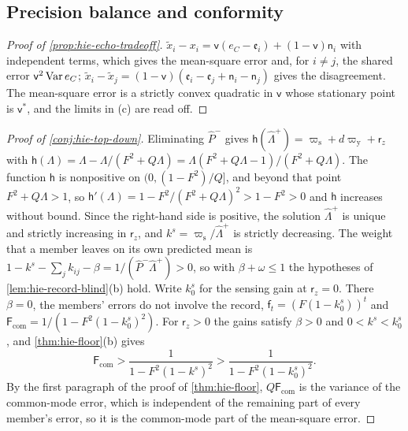 \subsection*{Precision balance and conformity}

\begin{proof}[Proof of \cref{prop:hie-echo-tradeoff}]
$\tilde x_i-x_i=\mathsf v(e_C-\mathfrak e_i)+(1-\mathsf v)\mathsf n_i$ with independent terms, which gives the mean-square error and, for $i\neq j$, the shared error $\mathsf v^2\operatorname{Var} e_C$; $\tilde x_i-\tilde x_j=(1-\mathsf v)(\mathfrak e_i-\mathfrak e_j+\mathsf n_i-\mathsf n_j)$ gives the disagreement. The mean-square error is a strictly convex quadratic in $\mathsf v$ whose stationary point is $\mathsf v^\ast$, and the limits in (c) are read off.
\end{proof}

\begin{proof}[Proof of \cref{conj:hie-top-down}]
Eliminating $\hat P^-$ gives $\mathsf h(\hat\Lambda^+)=\varpi_{\mathrm s}+d\varpi_{\mathrm y}+\mathsf r_z$ with $\mathsf h(\Lambda)=\Lambda-\Lambda/(F^2+Q\Lambda)=\Lambda(F^2+Q\Lambda-1)/(F^2+Q\Lambda)$. The function $\mathsf h$ is nonpositive on $(0,(1-F^2)/Q]$, and beyond that point $F^2+Q\Lambda>1$, so $\mathsf h'(\Lambda)=1-F^2/(F^2+Q\Lambda)^2>1-F^2>0$ and $\mathsf h$ increases without bound. Since the right-hand side is positive, the solution $\hat\Lambda^+$ is unique and strictly increasing in $\mathsf r_z$, and $k^s=\varpi_{\mathrm s}/\hat\Lambda^+$ is strictly decreasing. The weight that a member leaves on its own predicted mean is $1-k^s-\sum_jk_{ij}-\beta=1/(\hat P^-\hat\Lambda^+)>0$, so with $\beta+\omega\le1$ the hypotheses of \cref{lem:hie-record-blind}(b) hold. Write $k^s_0$ for the sensing gain at $\mathsf r_z=0$. There $\beta=0$, the members' errors do not involve the record, $\mathsf f_t=(F(1-k^s_0))^t$ and $\mathsf F_{\mathrm{com}}=1/(1-F^2(1-k^s_0)^2)$. For $\mathsf r_z>0$ the gains satisfy $\beta>0$ and $0<k^s<k^s_0$, and \cref{thm:hie-floor}(b) gives
\[
\mathsf F_{\mathrm{com}}>\frac{1}{1-F^2(1-k^s)^2}>\frac{1}{1-F^2(1-k^s_0)^2}.
\]
By the first paragraph of the proof of \cref{thm:hie-floor}, $Q\mathsf F_{\mathrm{com}}$ is the variance of the common-mode error, which is independent of the remaining part of every member's error, so it is the common-mode part of the mean-square error.
\end{proof}

